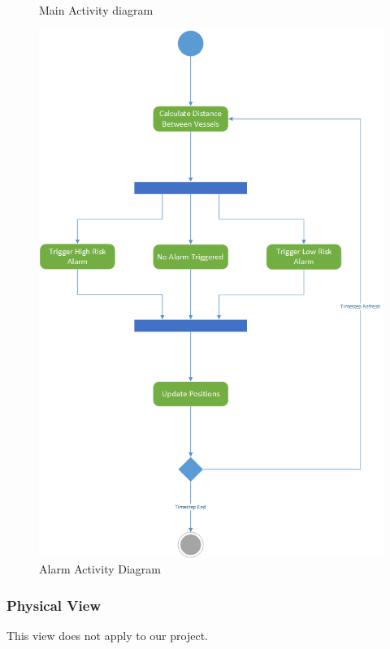 \documentclass[12pt]{article}
\begin{document}
\begin{figure}[h!]
    \caption{Main Activity diagram}
    \label{fig:UMLActivityDiagram}
\end{figure}
\clearpage
\begin{figure}[h!]
    \centering
    \includegraphics[scale=0.75]{alarm_activity_diagram}
    \caption{Alarm Activity Diagram}
    \label{fig:AlarmActivityDiagram}
\end{figure}
\clearpage


\subsubsection{Physical View}
This view does not apply to our project.


\end{document}
